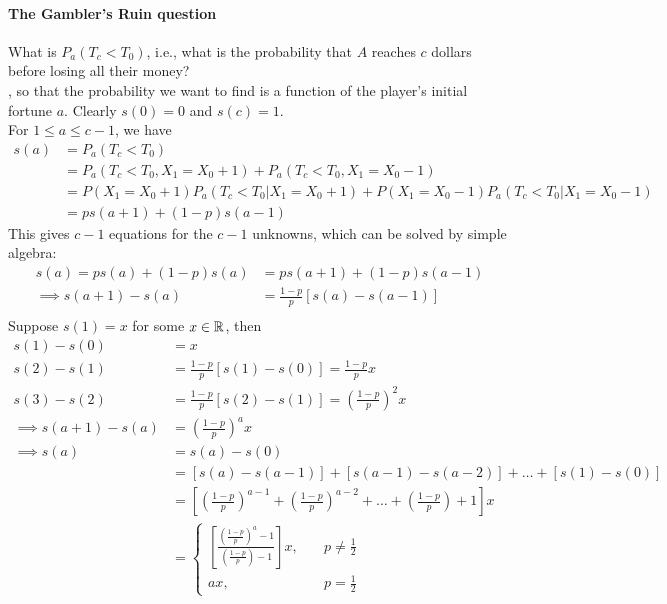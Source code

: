 \documentclass[11pt]{article}
\begin{document}
    \paragraph{The Gambler's Ruin question} What is $P_a(T_c < T_0)$, i.e., what is the probability that $A$ reaches $c$ dollars before losing all their money? \\
     , so that the probability we want to find is a function of the player's initial fortune $a$. Clearly $s(0) = 0$ and $s(c) = 1$.\\
    For $1 \leq a \leq c - 1$, we have
    \begin{align*}
    	s(a) &= P_a(T_c < T_0) \\
    	&= P_a(T_c < T_0, X_1 = X_0 + 1) + P_a(T_c < T_0, X_1 = X_0 - 1) \tag{$A$ either wins or loses $\$1$ on the first bet} \\
    	&= P(X_1 = X_0 + 1)P_a(T_c < T_0 | X_1 = X_0 + 1)+P(X_1 = X_0 - 1)P_a(T_c < T_0 | X_1 = X_0 - 1)\\
    	&= ps(a+1) + (1-p)s(a-1)
    \end{align*}
    This gives $c - 1$ equations for the $c - 1$ unknowns, which can be solved by simple algebra:
    \begin{align*}
    	s(a) = ps(a) + (1-p)s(a) &= ps(a+1) + (1-p)s(a-1) \tag{re-arranging}\\
    	\implies s(a+1) - s(a) &= \frac{1-p}{p}[s(a) - s(a-1)]\\
    \end{align*}
    Suppose $s(1) = x$ for some $x \in \mathbb{R}$, then
    \begin{align*}
    	s(1) - s(0) &= x \\
    	s(2) - s(1) &= \frac{1-p}{p}[s(1) - s(0)] = \frac{1-p}{p}x\\
    	s(3) - s(2) &= \frac{1-p}{p}[s(2) - s(1)] = \left(\frac{1-p}{p}\right)^2x \\
    	\implies s(a+1) - s(a) &= \left(\frac{1-p}{p}\right)^ax \quad \tag{for $1 \leq a \leq c$}\\
    	\implies s(a) &= s(a) - s(0) \\
    	&= [s(a) - s(a-1)] + [s(a-1) - s(a-2)] + \hdots + [s(1) - s(0)] \\
    	&= \left[\left(\frac{1-p}{p}\right)^{a-1} + \left(\frac{1-p}{p}\right)^{a-2} + \hdots + \left(\frac{1-p}{p}\right) + 1 \right]x\\
    	&= \begin{cases}
    		\left[ \frac{(\frac{1-p}{p})^a - 1}{(\frac{1-p}{p}) - 1} \right] x, \quad &p \neq \frac{1}{2} \\
    		ax, \quad & p = \frac{1}{2}
    	\end{cases}
    \end{align*}
\end{document}
